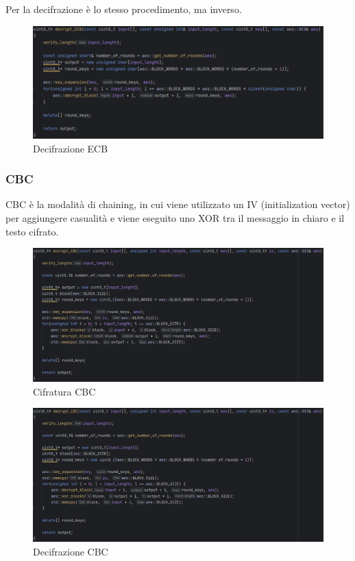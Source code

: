 \textsf{\small Per la decifrazione è lo stesso procedimento, ma inverso. } %

\begin{figure}[H]
	\centering
	\includegraphics[width=1\textwidth, height=1\textheight, keepaspectratio]{./images/code/cpp/modes/decrypt_ECB.PNG}
	\caption{Decifrazione ECB}
	\label{fig:decrypt_ECB}
\end{figure}

\subsubsection{CBC}

\textsf{\small CBC è la modalità di chaining, in cui viene utilizzato un IV (initialization vector) per aggiungere casualità e viene eseguito uno XOR tra il messaggio in chiaro e il testo cifrato.} %

\begin{figure}[H]
	\centering
	\includegraphics[width=1\textwidth, height=1\textheight, keepaspectratio]{./images/code/cpp/modes/encrypt_CBC.PNG}
	\caption{Cifratura CBC}
	\label{fig:encrypt_CBC}
\end{figure}

\textsf{\small } %

\begin{figure}[H]
	\centering
	\includegraphics[width=1\textwidth, height=1\textheight, keepaspectratio]{./images/code/cpp/modes/decrypt_CBC.PNG}
	\caption{Decifrazione CBC}
	\label{fig:decrypt_CBC}
\end{figure}

